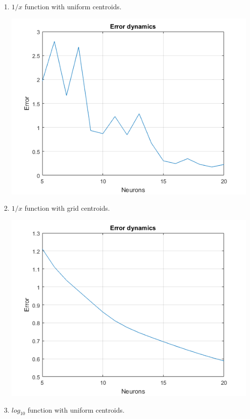 \documentclass[a4paper, 12pt]{article}
\begin{document}
\begin{enumerate}
\newpage
\item $1/x$ function with uniform centroids.

\includegraphics[scale = 0.8]{e11.png}

\item $1/x$ function with grid centroids.

\includegraphics[scale = 0.8]{e1.png}
\newpage
\item $log_{10}$ function with uniform centroids.


\end{enumerate}
\end{document}

